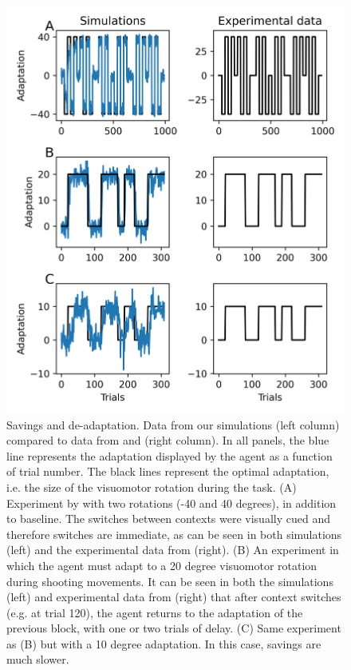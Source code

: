 \documentclass[a4paper,doc,floatsintext,natbib]{apa6}
\begin{document}
\begin{figure}
\centering
\includegraphics{./figures/figure_2.png}
\caption{Savings and de-adaptation. Data from our simulations (left column) compared to data from \cite{Kim_Neural_2015} and \cite{Oh_Minimizing_2019} (right column). In all panels, the blue line represents the adaptation displayed by the agent as a function of trial number. The black lines represent the optimal adaptation, i.e. the size of the visuomotor rotation during the task. (A) Experiment by \cite{Kim_Neural_2015} with two rotations (-40 and 40 degrees), in addition to baseline. The switches between contexts were visually cued and therefore switches are immediate, as can be seen in both simulations (left) and the experimental data from \cite{Kim_Neural_2015} (right). (B) An experiment in which the agent must adapt to a 20 degree visuomotor rotation during shooting movements. It can be seen in both the simulations (left) and experimental data from \cite{Oh_Minimizing_2019} (right) that after context switches (e.g. at trial 120), the agent returns to the adaptation of the previous block, with one or two trials of delay. (C) Same experiment as (B) but  with a 10 degree adaptation. In this case, savings are much slower.} \label{fig:oh-2019}
\end{figure}
\end{document}
